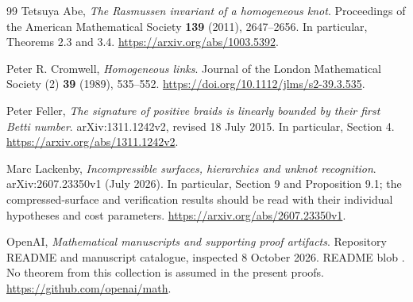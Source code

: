 \begin{thebibliography}{99}
Tetsuya Abe, \emph{The Rasmussen invariant of a homogeneous knot}.
Proceedings of the American Mathematical Society \textbf{139} (2011),
2647--2656. In particular, Theorems 2.3 and 3.4.
\url{https://arxiv.org/abs/1003.5392}.

Peter R. Cromwell, \emph{Homogeneous links}.
Journal of the London Mathematical Society (2) \textbf{39} (1989),
535--552.
\url{https://doi.org/10.1112/jlms/s2-39.3.535}.

Peter Feller, \emph{The signature of positive braids is linearly
bounded by their first Betti number}.
arXiv:1311.1242v2, revised 18 July 2015.
In particular, Section 4.
\url{https://arxiv.org/abs/1311.1242v2}.

Marc Lackenby, \emph{Incompressible surfaces, hierarchies and unknot
recognition}. arXiv:2607.23350v1 (July 2026).
In particular, Section 9 and Proposition 9.1; the compressed-surface
and verification results should be read with their individual
hypotheses and cost parameters.
\url{https://arxiv.org/abs/2607.23350v1}.

OpenAI, \emph{Mathematical manuscripts and supporting proof artifacts}.
Repository README and manuscript catalogue, inspected 8 October 2026.
README blob .
No theorem from this collection is assumed in the present proofs.
\url{https://github.com/openai/math}.

\end{thebibliography}
